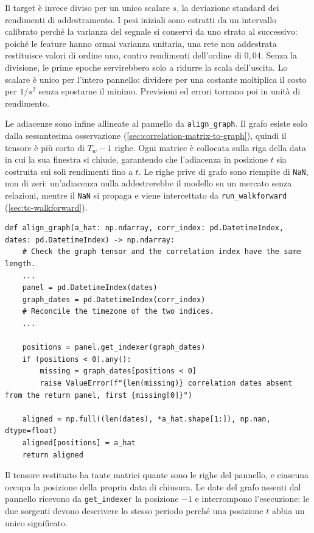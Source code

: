 Il target è invece diviso per un unico scalare $s$, la deviazione standard dei rendimenti di addestramento. I pesi iniziali sono estratti da un intervallo calibrato perché la varianza del segnale si conservi da uno strato al successivo: poiché le feature hanno ormai varianza unitaria, una rete non addestrata restituisce valori di ordine uno, contro rendimenti dell'ordine di $0{,}04$. Senza la divisione, le prime epoche servirebbero solo a ridurre la scala dell'uscita. Lo scalare è unico per l'intero pannello: dividere per una costante moltiplica il costo per $1/s^2$ senza spostarne il minimo. Previsioni ed errori tornano poi in unità di rendimento.

Le adiacenze sono infine allineate al pannello da \texttt{align\_graph}. Il grafo esiste solo dalla sessantesima osservazione (\cref{sec:correlation-matrix-to-graph}), quindi il tensore è più corto di $T_w-1$ righe. Ogni matrice è collocata sulla riga della data in cui la sua finestra si chiude, garantendo che l'adiacenza in posizione $t$ sia costruita sui soli rendimenti fino a $t$. Le righe prive di grafo sono riempite di \texttt{NaN}, non di zeri: un'adiacenza nulla addestrerebbe il modello su un mercato senza relazioni, mentre il \texttt{NaN} si propaga e viene intercettato da \texttt{run\_walkforward} (\cref{sec:tc-walkforward}).

\begin{listing}[H]
\begin{verbatim}
def align_graph(a_hat: np.ndarray, corr_index: pd.DatetimeIndex, dates: pd.DatetimeIndex) -> np.ndarray:
    # Check the graph tensor and the correlation index have the same length.
    ...
    panel = pd.DatetimeIndex(dates)
    graph_dates = pd.DatetimeIndex(corr_index)
    # Reconcile the timezone of the two indices.
    ...

    positions = panel.get_indexer(graph_dates)
    if (positions < 0).any():
        missing = graph_dates[positions < 0]
        raise ValueError(f"{len(missing)} correlation dates absent from the return panel, first {missing[0]}")

    aligned = np.full((len(dates), *a_hat.shape[1:]), np.nan, dtype=float)
    aligned[positions] = a_hat
    return aligned
\end{verbatim}
\caption{\texttt{align\_graph}}
\label{lst:align-graph}
\end{listing}

Il tensore restituito ha tante matrici quante sono le righe del pannello, e ciascuna occupa la posizione della propria data di chiusura. Le date del grafo assenti dal pannello ricevono da \texttt{get\_indexer} la posizione $-1$ e interrompono l'esecuzione: le due sorgenti devono descrivere lo stesso periodo perché una posizione $t$ abbia un unico significato.

